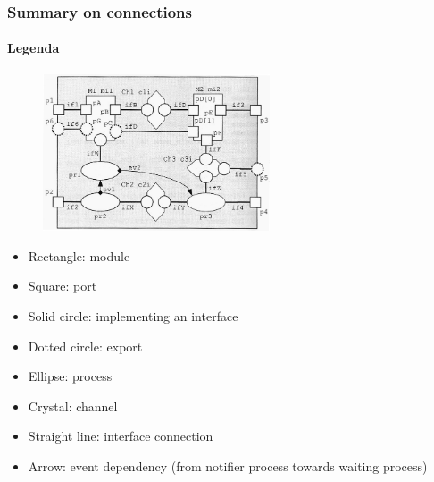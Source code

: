 \begin{frame}
\frametitle{Summary on connections}
\framesubtitle{Legenda}

\begin{figure}
\includegraphics[width=0.6\textwidth]{lecture12/img/connections.png}
\end{figure}
{\scriptsize
\begin{itemize}
\item Rectangle: module
\item Square: port
\item Solid circle: implementing an interface
\item Dotted circle: export
\item Ellipse: process
\item Crystal: channel
\item Straight line: interface connection
\item Arrow: event dependency (from notifier process towards waiting process)
\end{itemize}
}
\end{frame}

